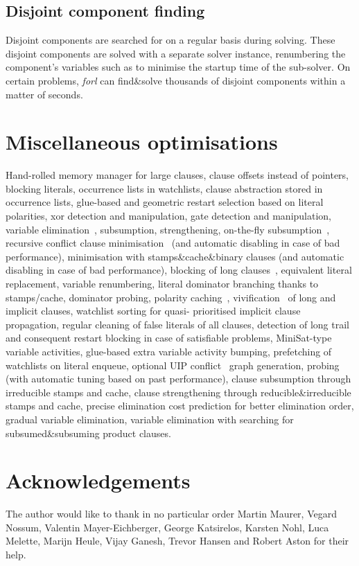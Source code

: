 \documentclass[final]{ieee}
\begin{document}
\subsection{Disjoint component finding}
Disjoint components are searched for on a regular basis during solving. These disjoint components are solved with a separate solver instance, renumbering the component's variables such as to minimise the startup time of the sub-solver. On certain problems, \emph{forl} can find\&solve thousands of disjoint components within a matter of seconds.

\section{Miscellaneous optimisations}
Hand-rolled memory manager for large clauses, clause offsets instead of pointers, blocking literals, occurrence lists in watchlists, clause abstraction stored in occurrence lists, glue-based and geometric restart selection based on literal polarities, xor detection and manipulation, gate detection and manipulation, variable elimination~\cite{DBLP:conf/sat/EenB05}, subsumption, strengthening, on-the-fly subsumption~\cite{DBLP:conf/sat/HanS09}, recursive conflict clause minimisation~\cite{DBLP:conf/sat/SorenssonB09} (and automatic disabling in case of bad performance), minimisation with stamps\&cache\&binary clauses (and automatic disabling in case of bad performance), blocking of long clauses~\cite{DBLP:conf/tacas/JarvisaloBH10}, equivalent literal replacement, variable renumbering, literal dominator branching thanks to stamps/cache, dominator probing, polarity caching~\cite{DBLP:conf/sat/PipatsrisawatD07}, vivification~\cite{DBLP:conf/ecai/PietteHS08} of long and implicit clauses, watchlist sorting for quasi-
prioritised implicit clause propagation, regular cleaning of false literals of all clauses, detection of long trail and consequent restart blocking in case of satisfiable problems, MiniSat-type variable activities, glue-based extra variable activity bumping, prefetching of watchlists on literal enqueue, optional UIP conflict~\cite{244560} graph generation, probing (with automatic tuning based on past performance), clause subsumption through irreducible stamps and cache, clause strengthening through reducible\&irreducible stamps and cache, precise elimination cost prediction for better elimination order, gradual variable elimination, variable elimination with searching for subsumed\&subsuming product clauses.

\section*{Acknowledgements}
The author would like to thank in no particular order Martin Maurer, Vegard Nossum, Valentin Mayer-Eichberger, George Katsirelos, Karsten Nohl, Luca Melette, Marijn Heule, Vijay Ganesh, Trevor Hansen and Robert Aston for their help.




\vfill
\pagebreak
\end{document}
